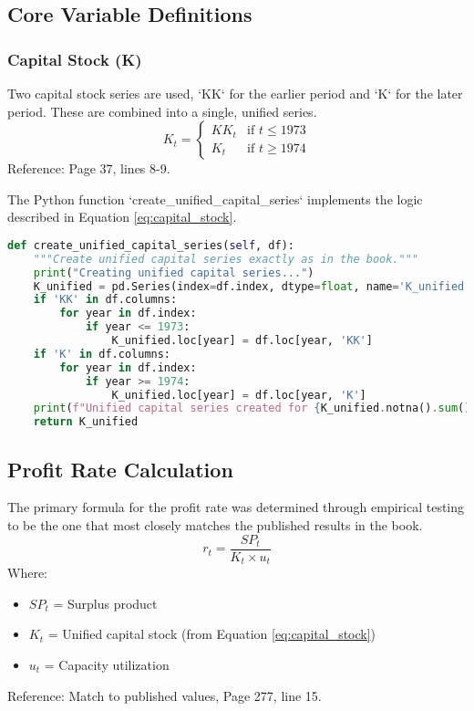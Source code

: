 \documentclass[12pt,a4paper]{article}
\begin{document}
\subsection{Core Variable Definitions}

\subsubsection{Capital Stock (K)}
Two capital stock series are used, `KK` for the earlier period and `K` for the later period. These are combined into a single, unified series.
\begin{equation}
K_t = \begin{cases}
KK_t & \text{if } t \leq 1973 \\
K_t & \text{if } t \geq 1974
\end{cases}
\label{eq:capital_stock}
\end{equation}
Reference: Page 37, lines 8-9.

\begin{tcolorbox}[colback=green!5!white,colframe=green!75!black,title=Implementation for Equation \ref{eq:capital_stock}]
The Python function `create_unified_capital_series` implements the logic described in Equation \ref{eq:capital_stock}.
\begin{lstlisting}[language=Python, caption=Unified Capital Stock Series, label=code:capital_stock]
def create_unified_capital_series(self, df):
    """Create unified capital series exactly as in the book."""
    print("Creating unified capital series...")
    K_unified = pd.Series(index=df.index, dtype=float, name='K_unified')
    if 'KK' in df.columns:
        for year in df.index:
            if year <= 1973:
                K_unified.loc[year] = df.loc[year, 'KK']
    if 'K' in df.columns:
        for year in df.index:
            if year >= 1974:
                K_unified.loc[year] = df.loc[year, 'K']
    print(f"Unified capital series created for {K_unified.notna().sum()} years")
    return K_unified
\end{lstlisting}
\end{tcolorbox}

\subsection{Profit Rate Calculation}

The primary formula for the profit rate was determined through empirical testing to be the one that most closely matches the published results in the book.
\begin{equation}
r_t = \frac{SP_t}{K_t \times u_t}
\label{eq:profit_rate}
\end{equation}
Where:
\begin{itemize}
    \item $SP_t$ = Surplus product
    \item $K_t$ = Unified capital stock (from Equation \ref{eq:capital_stock})
    \item $u_t$ = Capacity utilization
\end{itemize}
Reference: Match to published values, Page 277, line 15.
\end{document}
